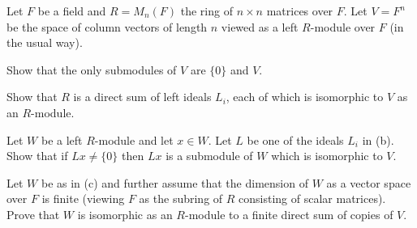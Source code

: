 Let $F$ be a field and $R=M_n(F)$ the ring of $n\times n$ matrices
over $F$. Let $V=F^n$ be the space of column vectors of length $n$
viewed as a left $R$-module over $F$ (in the usual way).
\begin{alist}
\item Show that the only submodules of $V$ are $\{0\}$ and $V$.
\item Show that $R$ is a direct sum of left ideals $L_i$, each of
which is isomorphic to $V$ as an $R$-module.
\item Let $W$ be a left $R$-module and let $x\in W$. Let $L$ be one of
the ideals $L_i$ in (b). Show that if $Lx\neq \{0\}$ then $Lx$ is a
submodule of $W$ which is isomorphic to $V$.
\item Let $W$ be as in (c) and further assume that the dimension of
$W$ as a vector space over $F$ is finite (viewing $F$ as the subring
of $R$ consisting of scalar matrices). Prove that $W$ is isomorphic as
an $R$-module to a finite direct sum of copies of $V$.
\end{alist}
